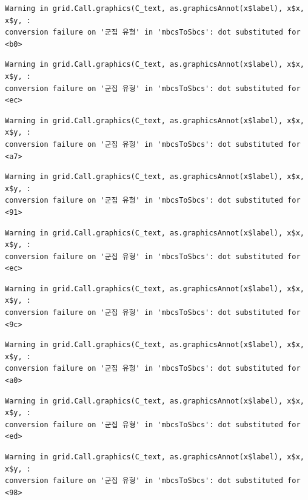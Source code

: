 \documentclass[
  letterpaper,
  DIV=11,
  numbers=noendperiod]{scrreprt}
\begin{document}
\begin{verbatim}
Warning in grid.Call.graphics(C_text, as.graphicsAnnot(x$label), x$x, x$y, :
conversion failure on '군집 유형' in 'mbcsToSbcs': dot substituted for <b0>
\end{verbatim}

\begin{verbatim}
Warning in grid.Call.graphics(C_text, as.graphicsAnnot(x$label), x$x, x$y, :
conversion failure on '군집 유형' in 'mbcsToSbcs': dot substituted for <ec>
\end{verbatim}

\begin{verbatim}
Warning in grid.Call.graphics(C_text, as.graphicsAnnot(x$label), x$x, x$y, :
conversion failure on '군집 유형' in 'mbcsToSbcs': dot substituted for <a7>
\end{verbatim}

\begin{verbatim}
Warning in grid.Call.graphics(C_text, as.graphicsAnnot(x$label), x$x, x$y, :
conversion failure on '군집 유형' in 'mbcsToSbcs': dot substituted for <91>
\end{verbatim}

\begin{verbatim}
Warning in grid.Call.graphics(C_text, as.graphicsAnnot(x$label), x$x, x$y, :
conversion failure on '군집 유형' in 'mbcsToSbcs': dot substituted for <ec>
\end{verbatim}

\begin{verbatim}
Warning in grid.Call.graphics(C_text, as.graphicsAnnot(x$label), x$x, x$y, :
conversion failure on '군집 유형' in 'mbcsToSbcs': dot substituted for <9c>
\end{verbatim}

\begin{verbatim}
Warning in grid.Call.graphics(C_text, as.graphicsAnnot(x$label), x$x, x$y, :
conversion failure on '군집 유형' in 'mbcsToSbcs': dot substituted for <a0>
\end{verbatim}

\begin{verbatim}
Warning in grid.Call.graphics(C_text, as.graphicsAnnot(x$label), x$x, x$y, :
conversion failure on '군집 유형' in 'mbcsToSbcs': dot substituted for <ed>
\end{verbatim}

\begin{verbatim}
Warning in grid.Call.graphics(C_text, as.graphicsAnnot(x$label), x$x, x$y, :
conversion failure on '군집 유형' in 'mbcsToSbcs': dot substituted for <98>
\end{verbatim}
\end{document}
